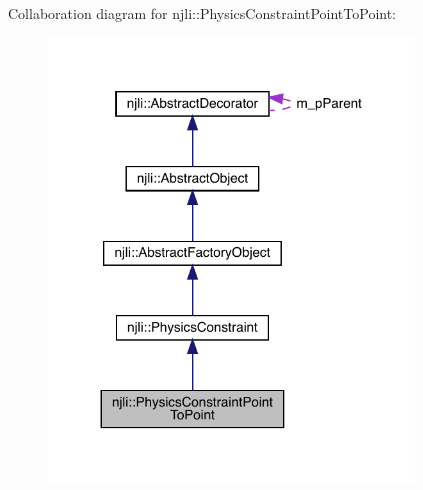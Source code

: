 Collaboration diagram for njli\+:\+:Physics\+Constraint\+Point\+To\+Point\+:\nopagebreak
\begin{figure}[H]
\begin{center}
\leavevmode
\includegraphics[width=275pt]{classnjli_1_1_physics_constraint_point_to_point__coll__graph}
\end{center}
\end{figure}
